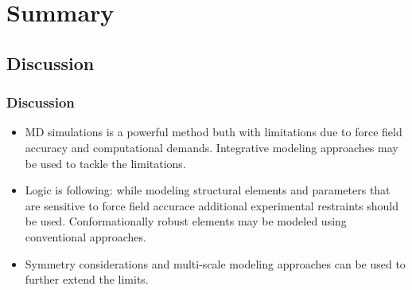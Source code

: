 \section{Summary}
\subsection{Discussion}
\begin{frame}
    \frametitle{Discussion}
\begin{itemize}
 \item MD simulations is a powerful method buth with limitations due to force field accuracy and computational demands. Integrative modeling approaches may be used to tackle the limitations.

\item Logic is following: while modeling structural elements and parameters that are sensitive to force field accurace additional experimental restraints should be used. Conformationally robust elements may be modeled using conventional approaches.

\item Symmetry considerations and multi-scale modeling approaches can be used to further extend the limits.
\end{itemize}


\end{frame}

